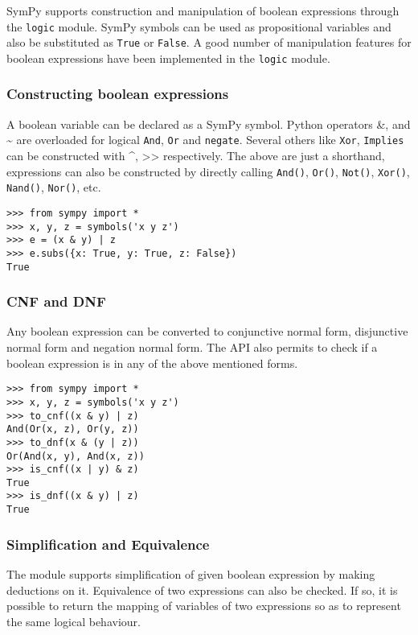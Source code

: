 
SymPy supports construction and manipulation of boolean expressions
through the \texttt{logic} module. SymPy symbols can be used as
propositional variables and also be substituted as \texttt{True}
or \texttt{False}. A good number of manipulation features for boolean
expressions have been implemented in the \texttt{logic} module.

\subsubsection{Constructing boolean expressions}

A boolean variable can be declared as a SymPy symbol. Python
operators \&, \textbar{} and \textasciitilde{} are overloaded for logical \texttt{And},
\texttt{Or} and \texttt{negate}. Several others like \texttt{Xor},
\texttt{Implies} can be constructed with \^{}, \textgreater\textgreater{} respectively.
The above are just a shorthand, expressions can also be constructed
by directly calling \verb|And()|, \verb|Or()|, \verb|Not()|,
\verb|Xor()|, \verb|Nand()|, \verb|Nor()|, etc.

\begin{verbatim}
>>> from sympy import *
>>> x, y, z = symbols('x y z')
>>> e = (x & y) | z
>>> e.subs({x: True, y: True, z: False})
True
\end{verbatim}

\subsubsection{CNF and DNF}

Any boolean expression can be converted to conjunctive normal
form, disjunctive normal form and negation normal form. The
API also permits to check if a boolean expression is in any
of the above mentioned forms.

\begin{verbatim}
>>> from sympy import *
>>> x, y, z = symbols('x y z')
>>> to_cnf((x & y) | z)
And(Or(x, z), Or(y, z))
>>> to_dnf(x & (y | z))
Or(And(x, y), And(x, z))
>>> is_cnf((x | y) & z)
True
>>> is_dnf((x & y) | z)
True
\end{verbatim}

\subsubsection{Simplification and Equivalence}

The module supports simplification of given boolean expression
by making deductions on it. Equivalence of two expressions can
also be checked. If so, it is possible to return the mapping of
variables of two expressions so as to represent the
same logical behaviour.

